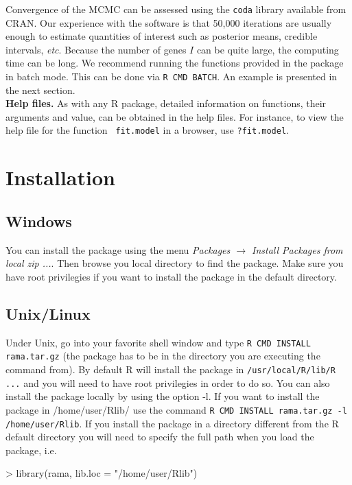 \documentclass[11pt]{article}
\begin{document}
Convergence of the  MCMC can be assessed using the {\tt coda} library available from CRAN. 
Our experience with the software is that 50,000 iterations are 
usually enough to estimate quantities of interest such as posterior means, credible intervals, \textit{etc}. 
Because the number of genes $I$ can be quite large, the computing time can be long. 
We recommend running the functions provided in the package in batch mode. This can be done via {\tt R CMD BATCH}. An example is
presented in the next section. \\


{\bf Help files.}  As with any R package, detailed information on
functions, their arguments and value, can be obtained in the help
files. For instance, to view the help file for the function {\tt
  fit.model} in a browser, use {\tt ?fit.model}. 

\section{Installation}
\subsection{Windows}
You can install the package using the menu \textit{Packages $\rightarrow$ Install Packages from local zip ...}.
Then browse you local directory to find the package. Make sure you have root privilegies if you want to install 
the package in the default directory. 
\subsection{Unix/Linux}
Under Unix, go into your favorite shell window and type 
{\tt R CMD INSTALL rama.tar.gz} (the package has to be in the directory you are executing the command from).  
By default R will install the package in {\tt /usr/local/R/lib/R ...} and you will need to have root privilegies in order to do so. 
You can also install the package locally by using the option -l. If you want to install the package in /home/user/Rlib/
use the command {\tt R CMD INSTALL rama.tar.gz -l /home/user/Rlib}. If you install the package in a directory different from the 
R default directory you will need to specify the full path when you load the package, i.e. 

\begin{Schunk}
\begin{Sinput}
> library(rama, lib.loc = "/home/user/Rlib")
\end{Sinput}
\end{Schunk}
\end{document}
